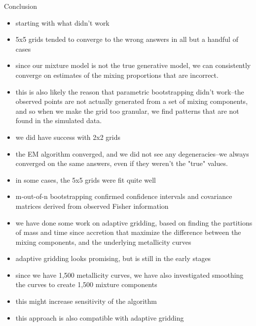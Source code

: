 \documentclass{beamer}
\begin{document}
\begin{frame}[shrink]{Conclusion}
	
	\begin{itemize}
		\item starting with what didn't work
		\item 5x5 grids tended to converge to the wrong answers in all but a handful of cases
		\item since our mixture model is not the true generative model, we can consistently converge on estimates of the mixing proportions that are incorrect.
		\item this is also likely the reason that parametric bootstrapping didn't work--the observed points are not actually generated from a set of mixing components, and so when we make the grid too granular, we find patterns that are not found in the simulated data.
	\end{itemize}	
	\begin{itemize}
		\item we did have success with 2x2 grids
		\item the EM algorithm converged, and we did not see any degeneracies--we always converged on the same answers, even if they weren't the "true" values.
		\item in some cases, the 5x5 grids were fit quite well
		\item m-out-of-n bootstrapping confirmed confidence intervals and covariance matrices derived from observed Fisher information
		
	\end{itemize}
	
	\begin{itemize}
		\item we have done some work on adaptive gridding, based on finding the partitions of mass and time since accretion that maximize the difference between the mixing components, and the underlying metallicity curves
		\item adaptive gridding looks promising, but is still in the early stages
		
		\item since we have 1,500 metallicity curves, we have also investigated smoothing the curves to create 1,500 mixture components
		\item this might increase sensitivity of the algorithm
		\item this approach is also compatible with adaptive gridding
	\end{itemize}
	
\end{frame}
\end{document}
